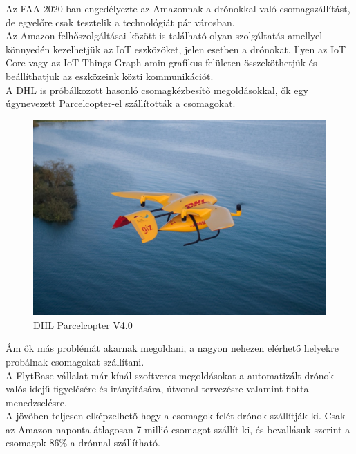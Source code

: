 Az FAA 2020-ban engedélyezte az Amazonnak a drónokkal való csomagszállítást, de egyelőre csak tesztelik a technológiát pár városban.\\
Az Amazon felhőszolgáltásai között is található olyan szolgáltatás amellyel könnyedén kezelhetjük az IoT eszközöket, jelen esetben a drónokat.
Ilyen az IoT Core vagy az IoT Things Graph amin grafikus felületen összeköthetjük és beállíthatjuk az eszközeink közti kommunikációt. \\
A DHL is próbálkozott hasonló csomagkézbesítő megoldásokkal, ők egy úgynevezett  Parcelcopter-el szállították a csomagokat.
\begin{figure}[h]
    \centering
    \includegraphics[scale=1.0]{images/parcelcopter.jpeg}
    \caption{DHL Parcelcopter V4.0}
    \label{fig:parcelcopter}
\end{figure}
Ám ők más problémát akarnak megoldani, a nagyon nehezen elérhető helyekre probálnak csomagokat szállítani.\\
A FlytBase \cite{flyt} vállalat már kínál szoftveres megoldásokat a automatizált drónok valós idejű figyelésére és irányítására, útvonal tervezésre valamint flotta menedzselésre.\\
A jövőben teljesen elképzelhető hogy a csomagok felét drónok szállítják ki. Csak az Amazon naponta átlagosan 7 millió csomagot szállít ki,
és bevallásuk szerint a csomagok 86\%-a drónnal szállítható.


